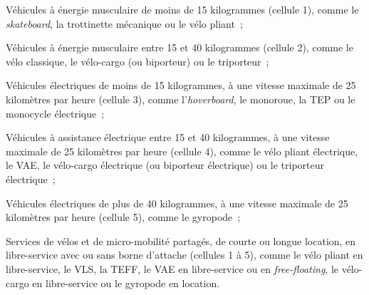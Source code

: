 \begin{refsegment}
    \begin{customitemize}
\item Véhicules à énergie musculaire de moins de 15 kilogrammes (cellule 1), comme le \textsl{skateboard}, la trottinette mécanique ou le vélo pliant~;
\item Véhicules à énergie musculaire entre 15 et 40 kilogrammes (cellule 2), comme le vélo classique, le vélo-cargo (ou biporteur) ou le triporteur~;
\item Véhicules électriques de moins de 15 kilogrammes, à une vitesse maximale de 25 kilomètres par heure (cellule 3), comme l'\textsl{hoverboard}, le monoroue, la \acrshort{TEP} ou le monocycle électrique~;
\item Véhicules à assistance électrique entre 15 et 40 kilogrammes, à une vitesse maximale de 25 kilomètres par heure (cellule 4), comme le vélo pliant électrique, le \acrshort{VAE}, le vélo-cargo électrique (ou biporteur électrique) ou le triporteur électrique~;
\item Véhicules électriques de plus de 40 kilogrammes, à une vitesse maximale de 25 kilomètres par heure (cellule 5), comme le gyropode~;
\item Services de vélos et de micro-mobilité partagés, de courte ou longue location, en libre-service avec ou sans borne d’attache (cellules 1 à 5), comme le vélo pliant en libre-service, le \acrshort{VLS}, la \acrshort{TEFF}, le \acrshort{VAE} en libre-service ou en \textsl{free-floating}, le vélo-cargo en libre-service ou le gyropode en location.
    \end{customitemize}%


\end{refsegment}
